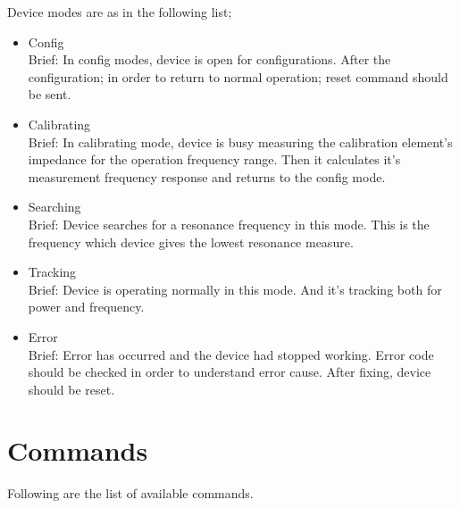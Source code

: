 \documentclass{article}
\begin{document}
Device modes are as in the following list;
\begin{itemize}
      \item Config
            \\ Brief: In config modes, device is open for configurations. After the configuration; in order to
            return to normal operation; reset command should be sent.
      \item Calibrating
            \\ Brief: In calibrating mode, device is busy measuring the calibration element's impedance for the operation
            frequency range. Then it calculates it's measurement frequency response and returns to the config mode.
      \item Searching
            \\ Brief: Device searches for a resonance frequency in this mode. This is the frequency which device gives
            the lowest resonance measure.
      \item Tracking
            \\ Brief: Device is operating normally in this mode. And it's tracking both for power and frequency.
      \item Error
            \\ Brief: Error has occurred and the device had stopped working. Error code should be checked in order to
            understand error cause. After fixing, device should be reset.
\end{itemize}

\section{Commands}
Following are the list of available commands.
\end{document}
